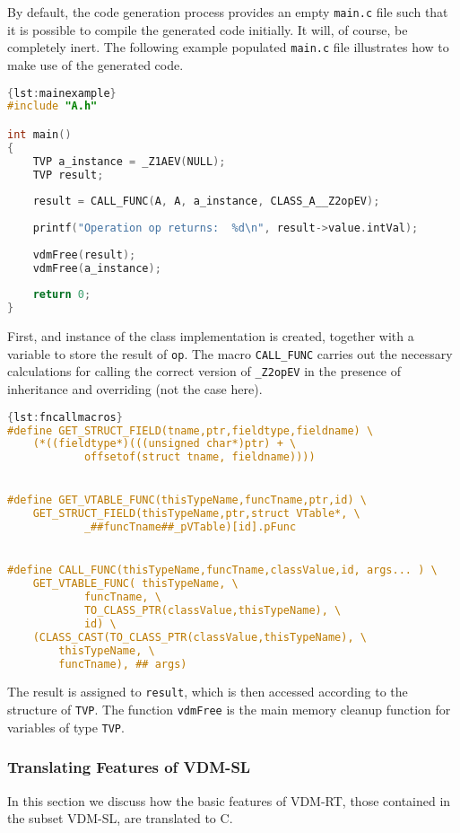 By default, the code generation process provides an empty \texttt{main.c} file such that it is possible to compile the generated code initially.
%
It will, of course, be completely inert.
%
The following example populated \texttt{main.c} file illustrates how to make use of the generated code.
%
%
%
\begin{lstlisting}[language=C,caption={Example \texttt{main.c} file.},label={lst:mainexample},frame=tlbr]{lst:mainexample}
#include "A.h"

int main()
{
	TVP a_instance = _Z1AEV(NULL);
	TVP result;
	
	result = CALL_FUNC(A, A, a_instance, CLASS_A__Z2opEV);
	
	printf("Operation op returns:  %d\n", result->value.intVal);
	
	vdmFree(result);
	vdmFree(a_instance);
	
	return 0;
}
\end{lstlisting}
%
%
%
First, and instance of the class implementation is created, together with a variable to store the result of \texttt{op}.
%
The macro \texttt{CALL\_FUNC} carries out the necessary calculations for calling the correct version of \texttt{\_Z2opEV} in the presence of inheritance and overriding (not the case here).
%
%
%
\begin{lstlisting}[language=C,caption={Macros supporting function calls.},label={lst:fncallmacros},frame=tlbr]{lst:fncallmacros}
#define GET_STRUCT_FIELD(tname,ptr,fieldtype,fieldname) \
	(*((fieldtype*)(((unsigned char*)ptr) + \
			offsetof(struct tname, fieldname))))


#define GET_VTABLE_FUNC(thisTypeName,funcTname,ptr,id) \
	GET_STRUCT_FIELD(thisTypeName,ptr,struct VTable*, \
			_##funcTname##_pVTable)[id].pFunc


#define CALL_FUNC(thisTypeName,funcTname,classValue,id, args... ) \
	GET_VTABLE_FUNC( thisTypeName, \
			funcTname, \
			TO_CLASS_PTR(classValue,thisTypeName), \
			id) \
	(CLASS_CAST(TO_CLASS_PTR(classValue,thisTypeName), \
		thisTypeName, \
		funcTname), ## args)
\end{lstlisting}
%
%
%
The result is assigned to \texttt{result}, which is then accessed according to the structure of \texttt{TVP}.
%
The function \texttt{vdmFree} is the main memory cleanup function for variables of type \texttt{TVP}.
%
%
%
\subsubsection{Translating Features of VDM-SL}
In this section we discuss how the basic features of VDM-RT, those contained in the subset VDM-SL, are translated to C.
%
